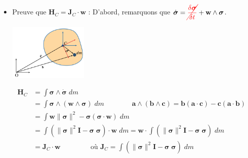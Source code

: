 \documentclass[a4paper]{article}
\begin{document}
\begin{itemize}
\item Preuve que $ \textbf{H}_C = \textbf{J}_C \cdot \textbf{w} $ : 
D'abord, remarquons que $\displaystyle \dot{\boldsymbol{\sigma}} = \textcolor{red}{\cancel{\frac{\delta \boldsymbol{\sigma}}{\delta t}}} + \textbf{w} \wedge \boldsymbol{\sigma} $.
\begin{center} \includegraphics[width=0.3\textwidth]{images/Solide.PNG} \end{center}
\begin{align*}
\textbf{H}_C &= \int \boldsymbol{\sigma} \wedge \dot{\boldsymbol{\sigma}} \; d m \\
&= \int \boldsymbol{\sigma} \wedge ( \textbf{w} \wedge \boldsymbol{\sigma} ) \; d m \qquad \qquad \textbf{a} \wedge (\textbf{b} \wedge \textbf{c}) = \textbf{b} (\textbf{a} \cdot \textbf{c}) - \textbf{c} (\textbf{a} \cdot \textbf{b}) \\
&= \int \textbf{w} \| \boldsymbol{\sigma} \|^2 - \boldsymbol{\sigma} (\boldsymbol{\sigma} \cdot \textbf{w}) \; d m \\
&= \int ( \| \boldsymbol{\sigma} \|^2 \textbf{I} - \boldsymbol{\sigma} \; \boldsymbol{\sigma} ) \cdot \textbf{w} \; d m = \textbf{w} \cdot \int ( \| \boldsymbol{\sigma} \|^2 \textbf{I} - \boldsymbol{\sigma} \; \boldsymbol{\sigma} ) \; d m \\
&= \textbf{J}_C \cdot \textbf{w} \qquad \qquad \text{ où } \textbf{J}_C = \int ( \| \boldsymbol{\sigma} \|^2 \textbf{I} - \boldsymbol{\sigma} \; \boldsymbol{\sigma} ) \; d m
\end{align*}






\end{itemize}
\end{document}
